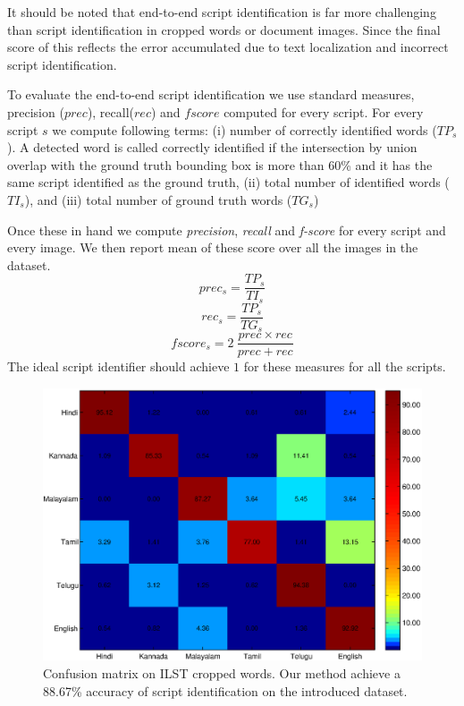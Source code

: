 It should be noted that end-to-end script
identification is far more challenging than
script identification in cropped words or
document images. Since the final score of
this reflects the error accumulated due to text localization
and incorrect script identification.

To evaluate the end-to-end script identification
we use standard measures, precision ($prec$),
recall($rec$) and $fscore$ computed for every script.
For every script $s$ we compute following terms: 
(i) number of correctly identified words ($TP_s$). A detected word
is called correctly identified if the intersection
by union overlap with the ground truth bounding box is more than 60\%
and it has the same script identified as the ground truth,
(ii) total number of identified words ($TI_s$), and
(iii) total number of ground truth words ($TG_s$)
 
Once these in hand we compute \textit{precision}, \textit{recall} and \textit{f-score}
for every script and every image. We then report mean of
these score over all the images in the dataset.  
\begin{equation}
prec_s = \frac{TP_s}{TI_s}
\end{equation}
\begin{equation}
rec_s = \frac{TP_s}{TG_s}
\end{equation}
\begin{equation}
fscore_s= 2~\frac{prec \times rec}{prec+rec}
\end{equation}
The ideal script identifier should achieve
$1$ for these measures for all the scripts.
\begin{figure}[t]
  \includegraphics[scale=0.5]{figures/confusion_1.eps}
  \caption{Confusion matrix on ILST cropped words. Our method achieve a 88.67\% accuracy of script identification on the introduced dataset.}
  \label{fig:cm}
\end{figure}

